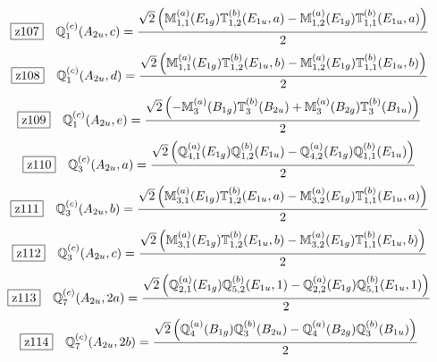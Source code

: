 \documentclass[fleqn,10pt,landscape]{jsarticle}
\begin{document}
\begin{dmath*}
\hspace*{3mm}\fbox{z107}\quad \mathbb{Q}_{1}^{(c)}(A_{2u},c)=\frac{\sqrt{2} \left(\mathbb{M}_{1,1}^{(a)}(E_{1g}) \mathbb{T}_{1,2}^{(b)}(E_{1u},a) - \mathbb{M}_{1,2}^{(a)}(E_{1g}) \mathbb{T}_{1,1}^{(b)}(E_{1u},a)\right)}{2}
\end{dmath*}
\begin{dmath*}
\hspace*{3mm}\fbox{z108}\quad \mathbb{Q}_{1}^{(c)}(A_{2u},d)=\frac{\sqrt{2} \left(\mathbb{M}_{1,1}^{(a)}(E_{1g}) \mathbb{T}_{1,2}^{(b)}(E_{1u},b) - \mathbb{M}_{1,2}^{(a)}(E_{1g}) \mathbb{T}_{1,1}^{(b)}(E_{1u},b)\right)}{2}
\end{dmath*}
\begin{dmath*}
\hspace*{3mm}\fbox{z109}\quad \mathbb{Q}_{1}^{(c)}(A_{2u},e)=\frac{\sqrt{2} \left(- \mathbb{M}_{3}^{(a)}(B_{1g}) \mathbb{T}_{3}^{(b)}(B_{2u}) + \mathbb{M}_{3}^{(a)}(B_{2g}) \mathbb{T}_{3}^{(b)}(B_{1u})\right)}{2}
\end{dmath*}
\begin{dmath*}
\hspace*{3mm}\fbox{z110}\quad \mathbb{Q}_{3}^{(c)}(A_{2u},a)=\frac{\sqrt{2} \left(\mathbb{Q}_{4,1}^{(a)}(E_{1g}) \mathbb{Q}_{1,2}^{(b)}(E_{1u}) - \mathbb{Q}_{4,2}^{(a)}(E_{1g}) \mathbb{Q}_{1,1}^{(b)}(E_{1u})\right)}{2}
\end{dmath*}
\begin{dmath*}
\hspace*{3mm}\fbox{z111}\quad \mathbb{Q}_{3}^{(c)}(A_{2u},b)=\frac{\sqrt{2} \left(\mathbb{M}_{3,1}^{(a)}(E_{1g}) \mathbb{T}_{1,2}^{(b)}(E_{1u},a) - \mathbb{M}_{3,2}^{(a)}(E_{1g}) \mathbb{T}_{1,1}^{(b)}(E_{1u},a)\right)}{2}
\end{dmath*}
\begin{dmath*}
\hspace*{3mm}\fbox{z112}\quad \mathbb{Q}_{3}^{(c)}(A_{2u},c)=\frac{\sqrt{2} \left(\mathbb{M}_{3,1}^{(a)}(E_{1g}) \mathbb{T}_{1,2}^{(b)}(E_{1u},b) - \mathbb{M}_{3,2}^{(a)}(E_{1g}) \mathbb{T}_{1,1}^{(b)}(E_{1u},b)\right)}{2}
\end{dmath*}
\begin{dmath*}
\hspace*{3mm}\fbox{z113}\quad \mathbb{Q}_{7}^{(c)}(A_{2u},2a)=\frac{\sqrt{2} \left(\mathbb{Q}_{2,1}^{(a)}(E_{1g}) \mathbb{Q}_{5,2}^{(b)}(E_{1u},1) - \mathbb{Q}_{2,2}^{(a)}(E_{1g}) \mathbb{Q}_{5,1}^{(b)}(E_{1u},1)\right)}{2}
\end{dmath*}
\begin{dmath*}
\hspace*{3mm}\fbox{z114}\quad \mathbb{Q}_{7}^{(c)}(A_{2u},2b)=\frac{\sqrt{2} \left(\mathbb{Q}_{4}^{(a)}(B_{1g}) \mathbb{Q}_{3}^{(b)}(B_{2u}) - \mathbb{Q}_{4}^{(a)}(B_{2g}) \mathbb{Q}_{3}^{(b)}(B_{1u})\right)}{2}
\end{dmath*}
\end{document}
